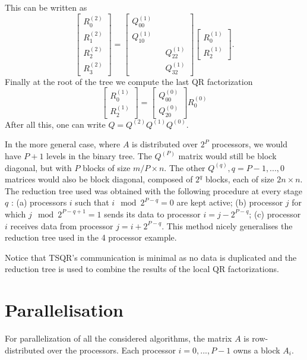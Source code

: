 \documentclass[a4paper, 12pt,oneside]{article}
\begin{document}
		This can be written as
		$$
		\left[\begin{array}{c}
		{R}_0^{(2)} \\
		{R}_1^{(2)} \\
		{R}_2^{(2)} \\
		{R}_3^{(2)}
		\end{array}\right]=\left[\begin{array}{ccc}
			{Q}_{00}^{(1)} & & \\
			{Q}_{10}^{(1)} & & \\
			& & {Q}_{22}^{(1)} \\
			& & {Q}_{32}^{(1)} 
		\end{array}\right]\left[\begin{array}{c}
		R_0^{(1)} \\
		R_2^{(1)}
		\end{array}\right].
		$$
		Finally at the root of the tree we compute the last QR factorization
		$$
		\left[\begin{array}{c}
		R_0^{(1)} \\
		R_2^{(1)}
		\end{array}\right]=\left[\begin{array}{c}
			{Q}_{00}^{(0)} \\
			{Q}_{20}^{(0)}
		\end{array}\right]
		R_0^{(0)}
		$$
		After all this, one can write ${Q}=Q^{(2)}Q^{(1)}Q^{(0)}$.

		In the more general case, where $A$ is distributed over $2^P$ processors, we would have $P+1$ levels in the binary tree. The $Q^{(P)}$ matrix would still be block diagonal, but with $P$ blocks of size $m/P\times n$. The other $Q^{(q)}, q=P-1,...,0$ matrices would also be block diagonal, composed of $2^q$ blocks, each of size $2n\times n$. 
		The reduction tree used was obtained with the following procedure at every stage $q$ :
		(a) processors $i$ such that $i\mod 2^{P-q}=0$ are kept active; (b) processor $j$ for which $j\mod 2^{P-q+1}=1$ sends its data to processor $i=j-2^{P-q}$; (c) processor $i$ receives data from processor $j=i+2^{P-q}$. This method nicely generalises the reduction tree used in the 4 processor example. 

		Notice that TSQR's communication is minimal as no data is duplicated and the reduction tree is used to combine the results of the local QR factorizations.
	\section{Parallelisation}
		For parallelization of all the considered algorithms, the matrix ${A}$ is row-distributed over the processors. Each processor $i=0,...,P-1$ owns a block ${A}_i$.
		
\end{document}

